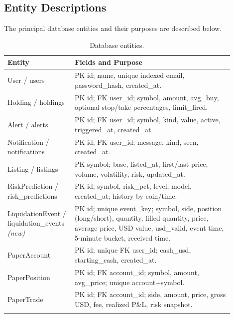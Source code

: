 \subsection{Entity Descriptions}
The principal database entities and their purposes are described below.
{\renewcommand{\arraystretch}{1.3}
\begin{longtable}{|p{0.24\linewidth}|p{0.66\linewidth}|}
\hline\textbf{Entity} & \textbf{Fields and Purpose}\\\hline\endhead
User / users & PK id; name, unique indexed email, password\_hash, created\_at.\\\hline
Holding / holdings & PK id; FK user\_id; symbol, amount, avg\_buy, optional stop/take percentages, limit\_fired.\\\hline
Alert / alerts & PK id; FK user\_id; symbol, kind, value, active, triggered\_at, created\_at.\\\hline
Notification / notifications & PK id; FK user\_id; message, kind, seen, created\_at.\\\hline
Listing / listings & PK symbol; base, listed\_at, first/last price, volume, volatility, risk, updated\_at.\\\hline
RiskPrediction / risk\_predictions & PK id; symbol, risk\_pct, level, model, created\_at; history by coin/time.\\\hline
LiquidationEvent / liquidation\_events \textit{(new)} & PK id; unique event\_key; symbol, side, position (long/short), quantity, filled quantity, price, average price, USD value, usd\_valid, event time, 5-minute bucket, received time.\\\hline
PaperAccount & PK id; unique FK user\_id; cash\_usd, starting\_cash, created\_at.\\\hline
PaperPosition & PK id; FK account\_id; symbol, amount, avg\_price; unique account+symbol.\\\hline
PaperTrade & PK id; FK account\_id; side, amount, price, gross USD, fee, realized P\&L, risk snapshot.\\\hline
\caption{Database entities.}\label{tab:entities}
\end{longtable}}

